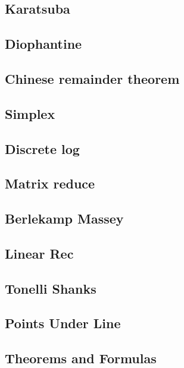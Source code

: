 \begin{multicols}{2}
\subsection{Karatsuba}

\subsection{Diophantine}

\subsection{Chinese remainder theorem}

\subsection{Simplex}

\subsection{Discrete log}

\subsection{Matrix reduce}

\subsection{Berlekamp Massey}

\subsection{Linear Rec}

\subsection{Tonelli Shanks}

\subsection{Points Under Line}

\subsection{Theorems and Formulas}



\end{multicols}

